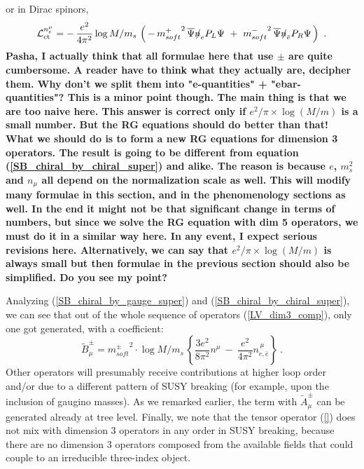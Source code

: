 \documentclass[12pt]{revtex4}
\newcommand{\slashed}[1]{\hbox{{$#1$}\llap{$/$}}}
\begin{document}
or in Dirac spinors,
\begin{equation}
\label{SB_chiral_by_chiral}
\mathcal{L}_{\rm ct}^{n_e^\mu} = 
-\, \frac{e^2}
 {4\pi^2} \log M/m_s\,
\left(\,
-\, {m_{soft}^+}^2\, 
\overline{\Psi} \slashed{n}_e P_L \Psi
~+~
{m_{soft}^-}^2\,
\overline{\Psi} \slashed{n}_{\bar{e}} P_R \Psi
\,
\right)~.
\end{equation}
{\bf Pasha, I actually think that all formulae here that  use $\pm$ are quite 
cumbersome. A reader have to think what they actually are, decipher them. 
Why don't we split them into "e-quantities" + "ebar-quantities"? This is a minor point though.
The main thing is that we are too naive here. This answer is correct only if 
$e^2/\pi \times \log (M/m)$ is a small number.  But the RG equations should do better than that!
What we should do is to form a new RG equations 
for dimension 3 operators. The result is going to be different from equation 
(\ref{SB_chiral_by_chiral_super}) and alike. The reason is because $e$, $m_s^2$ and $n_\mu$ 
all depend on the normalization scale as well. This will modify many formulae in 
this section, and in the phenomenology sections as well. In the end it might not be that significant 
change in terms of numbers, but since we solve the RG equation with dim 5 operators, we must
do it in a similar way here. In any event, I expect serious revisions here. 
Alternatively, we can say that $e^2/\pi \times \log (M/m)$ is always small but then 
formulae in the previous section should also be simplified. Do you see my point?}

        Analyzing (\ref{SB_chiral_by_gauge_super}) 
and (\ref{SB_chiral_by_chiral_super}),
we can see that out of the whole sequence of operators
(\ref{LV_dim3_comp}), only one got generated, with a 
coefficient:
\begin{equation}
\label{B_mu_coef}
\widetilde{B}^\pm_\mu = 
{m_{soft}^\pm}^2 \cdot \log M/m_s\,
\left \{ 
\frac{3e^2}
     {8\pi^2} n^\mu 
~-~
\frac{e^2}
     {4\pi^2} n_{e,\bar{e}}^{\,\mu}
\right \}~.
\end{equation}
Other operators will presumably receive contributions at higher loop order
and/or due to a different pattern of SUSY breaking (for example, upon the inclusion of gaugino masses). 
        As we remarked earlier, the term with $ \widetilde{A}^\pm_\mu $ can be generated already 
      at tree level. Finally, we note that the tensor operator (\ref{}) does not mix with 
      dimension 3 operators in any order in SUSY breaking, because there are no dimension 3 operators 
      composed from the available fields that could couple to an irreducible three-index object.  
\end{document}
